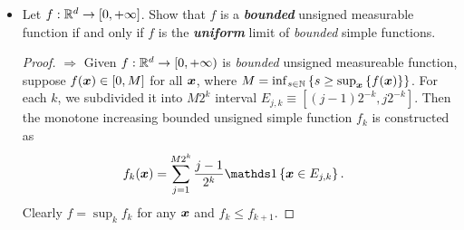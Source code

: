 \documentclass[11pt]{article}
\begin{document}
\begin{itemize}
\begin{proof}
\begin{enumerate}
\begin{align*}
\end{align*} is measureable and
\begin{align*}
\paren{\limsup\limits_{n\rightarrow\infty}f_{n}}^{-1}([0,\lambda))&= \paren{\inf_{k\ge 1}\sup_{n\ge k}f_{n}}^{-1}([0,\lambda))\\
&= \bigcup_{m}\bigcup_{k\ge 1}\bigcap_{n\ge k}f_{n}^{-1}([0,\lambda-\frac{1}{m}))
\end{align*} is measureable.
\item Assume that $g= f, a.e.$ where $f$ is unsigned measuresble, $g$ is unsigned function. Then $f= \limsup_{n\rightarrow \infty}f_{n}$ for a sequence of unsigned simple function. For any $\lambda\in [0,\infty]$, $g^{-1}((\lambda, \infty])$ is equal to $f^{-1}((\lambda, \infty])$ outside a null set. Then $g^{-1}((\lambda, \infty])$ is equal to 
\begin{align*}
\bigcup_{m}\bigcap_{k\ge 1}\bigcup_{n\ge k}f_{n}^{-1}((\lambda+\frac{1}{m},\infty])
\end{align*} outside a null set. As each $f_n$ is an unsigned simple function, $f_{n}^{-1}((\lambda+\frac{1}{m},\infty])$ is Lebesgue measureable, so as their countable union and intersection. Modifying a Lebesgue measurable set on a null set produces another Lebesgue measurable set, so $g^{-1}((\lambda, \infty])$ is measureable.
\item  Each $f_{n}= \sup_{k}f_{n,k}$ for some monotone unsigned simple function $f_{n,k}\le f_{n,k+1}$. For every convergent sequence of unsigned measureable function $f_{n}$, we can find a monotone increasing subsequence that is convergent to $f$. Therefore there exists a sequence of some monotone unsigned simple function $f_{1,1}, \cdots, f_{1,k}, \cdots, f_{n,k},  f_{n,k+1}, \cdots$ so that $f = \sup_{n\ge 1}\sup_{k\ge n}f_{n,k}$, so $f$ is unsigned measureable. 
\item Trivial, since $(\phi\circ f)^{-1}(\lambda,\infty] = f^{-1}(\phi^{-1}((\lambda,\infty]))$, which is measureable. \qed
\end{enumerate}
\end{proof}


\item \begin{exercise}
Let $f : {\mathbb R}^d \rightarrow [0,+\infty]$. Show that $f$ is a \emph{\textbf{bounded}} unsigned measurable function if and only if $f$ is the \emph{\textbf{uniform}} limit of \emph{bounded} simple functions.
\end{exercise}
\begin{proof}
$\Rightarrow$ Given $f : {\mathbb R}^d \rightarrow [0,+\infty)$ is \emph{bounded} unsigned measureable function, suppose $f(\boldsymbol{x})\in [0,M]$ for all $\boldsymbol{x}$, where $M= \inf_{s\in {\mathbb N}}\left\{s\ge \sup_{\boldsymbol{x}}\left\{f(\boldsymbol{x})\right\}\right\}$. For each $k$, we subdivided it into $M2^{k}$ interval $E_{j,k}\equiv [(j - 1)2^{-k}, j2^{-k}]$. Then the monotone increasing bounded unsigned simple function  $f_{k}$ is constructed as 
\begin{align*}
f_{k}(\mb{x}) &= \sum_{j=1}^{M2^{k}}\frac{j-1}{2^{k}}\ind{\mb{x}\in E_{j,k}}.
\end{align*}
Clearly $f= \sup_{k}f_{k}$ for any $\boldsymbol{x}$ and $f_{k}\le f_{k+1}$.


\end{proof}
\end{itemize}
\end{document}
